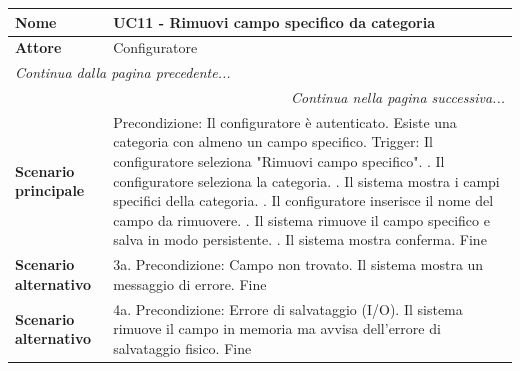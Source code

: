 \documentclass[12pt, a4paper, oneside]{report}
\begin{document}
\begin{tabularx}{\textwidth}{|l|X|}
    \hline
    \textbf{Nome}               & \textbf{UC11 - Rimuovi campo specifico da categoria} \\ \hline
    \textbf{Attore}             & Configuratore \\ \hline
    \endfirsthead 

    \hline
    \multicolumn{2}{|l|}{\textit{Continua dalla pagina precedente...}} \\ \hline
    \endhead 

    \hline
    \multicolumn{2}{|r|}{\textit{Continua nella pagina successiva...}} \\ \hline
    \endfoot 

    \hline
    \endlastfoot

    \textbf{Scenario principale} & 
    Precondizione: Il configuratore è autenticato. Esiste una categoria con almeno un campo specifico. \newline
    Trigger: Il configuratore seleziona "Rimuovi campo specifico". \newline
    1. Il configuratore seleziona la categoria. \newline
    2. Il sistema mostra i campi specifici della categoria. \newline
    3. Il configuratore inserisce il nome del campo da rimuovere. \newline
    4. Il sistema rimuove il campo specifico e salva in modo persistente. \newline
    5. Il sistema mostra conferma. \newline
    Fine \\ \hline
    
    \textbf{Scenario alternativo} & 
    3a. Precondizione: Campo non trovato. \newline
    Il sistema mostra un messaggio di errore. \newline
    Fine \\ \hline

    \textbf{Scenario alternativo} & 
    4a. Precondizione: Errore di salvataggio (I/O). \newline
    Il sistema rimuove il campo in memoria ma avvisa dell'errore di salvataggio fisico. \newline
    Fine \\ \hline
\end{tabularx}

\renewcommand{\arraystretch}{1.4} 
\end{document}
